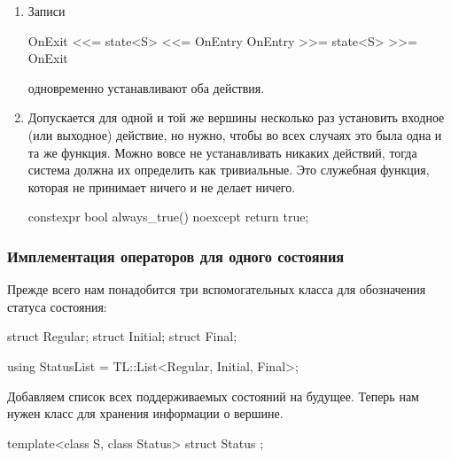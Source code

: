 \documentclass{article}
\begin{document}
{\begin{enumerate}
\item Записи 
\begin{cppcode}[\nonumbers]
OnExit <<= state<S> <<= OnEntry
OnEntry >>= state<S> >>= OnExit
\end{cppcode}
одновременно устанавливают оба действия.

\item Допускается для одной и той же вершины несколько раз установить входное (или выходное) действие, но нужно, чтобы во всех случаях это была одна и та же функция.
Можно вовсе не устанавливать никаких действий, тогда система должна их определить как тривиальные.
Это служебная функция, которая не принимает ничего и не делает ничего.
\begin{cppcode}[\nonumbers]
constexpr bool always_true() noexcept {
  return true;
}
\end{cppcode}
\end{enumerate}

\subsubsection{Имплементация операторов для одного состояния}

Прежде всего нам понадобится три вспомогательных класса для обозначения статуса состояния:
\begin{cppcode}[\nonumbers]
struct Regular;
struct Initial;
struct Final;

using StatusList = TL::List<Regular, Initial, Final>;
\end{cppcode}
Добавляем список всех поддерживаемых состояний на будущее.
Теперь нам нужен класс для хранения информации о вершине.
\begin{cppcode}[\nonumbers]
template<class S, class Status>
struct Status {};


\end{cppcode}}
\end{document}
